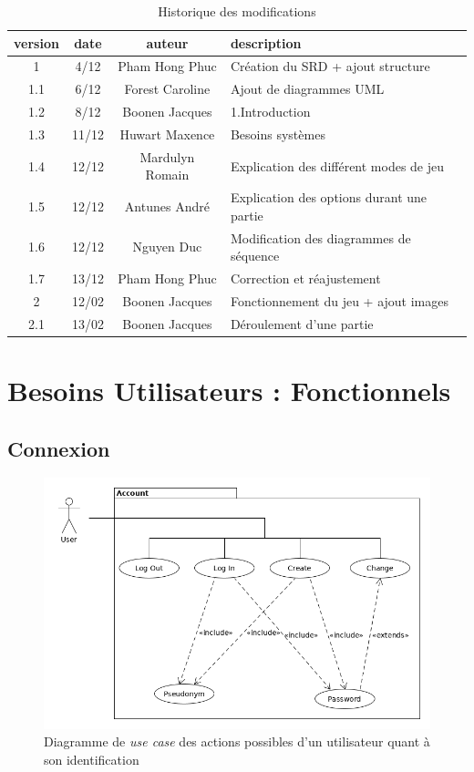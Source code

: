 \documentclass[10pt, a4paper]{article}
\begin{document}
		\begin{table}[h!]

			\centering

			\begin{tabular}{|c|c|c|p{50mm}|}
				\hline
				 \textbf{version} & \textbf{date} & \textbf{auteur}  & \textbf{description} \\ \hline
				 1 & 4/12 & Pham Hong Phuc & Création du SRD + ajout structure\\
				 1.1 & 6/12 & Forest Caroline & Ajout de diagrammes UML\\
				 1.2 & 8/12 & Boonen Jacques & 1.Introduction\\
				 1.3 & 11/12 & Huwart Maxence & Besoins systèmes\\
				 1.4 & 12/12 & Mardulyn Romain & Explication des différent modes de jeu\\
				 1.5 & 12/12 & Antunes André & Explication des options durant une partie\\
         1.6 & 12/12 & Nguyen Duc & Modification des diagrammes de séquence\\
         1.7 & 13/12 & Pham Hong Phuc & Correction et réajustement \\ \hline
				 2 & 12/02 & Boonen Jacques & Fonctionnement du jeu + ajout images \\ 
				 2.1 & 13/02 & Boonen Jacques & Déroulement d'une partie \\ 
				\hline
\end{tabular}
			\caption*{Historique des modifications}
			\end{table}
\clearpage


\section{Besoins Utilisateurs : Fonctionnels}


\subsection{Connexion}

\begin{figure}[ht]
\centering
\includegraphics[scale=0.5]{UC_connexion.png}
\caption{Diagramme de \textit{use case} des actions possibles d'un utilisateur quant à son identification}
\label{UC_co} %
\end{figure}
\end{document}
